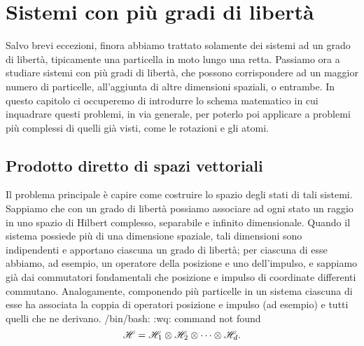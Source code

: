 \chapter{Sistemi con più gradi di libertà}
Salvo brevi eccezioni, finora abbiamo trattato solamente dei sistemi ad un grado di libertà, tipicamente una particella in moto lungo una retta.
Passiamo ora a studiare sistemi con più gradi di libertà, che possono corrispondere ad un maggior numero di particelle, all'aggiunta di altre dimensioni spaziali, o entrambe.
In questo capitolo ci occuperemo di introdurre lo schema matematico in cui inquadrare questi problemi, in via generale, per poterlo poi applicare a problemi più complessi di quelli già visti, come le rotazioni e gli atomi.

\section{Prodotto diretto di spazi vettoriali}
Il problema principale è capire come costruire lo spazio degli stati di tali sistemi.
Sappiamo che con un grado di libertà possiamo associare ad ogni stato un raggio in uno spazio di Hilbert complesso, separabile e infinito dimensionale.
Quando il sistema possiede più di una dimensione spaziale, tali dimensioni sono indipendenti e apportano ciascuna un grado di libertà; per ciascuna di esse abbiamo, ad esempio, un operatore della posizione e uno dell'impulso, e sappiamo già dai commutatori fondamentali che posizione e impulso di coordinate differenti commutano.
Analogamente, componendo più particelle in un sistema ciascuna di esse ha associata la coppia di operatori posizione e impulso (ad esempio) e tutti quelli che ne derivano.
/bin/bash: :wq: command not found
\begin{equation}
	\mathscr H=\mathscr H_1\otimes\mathscr H_2\otimes\cdots\otimes\mathscr H_d.
\end{equation}

